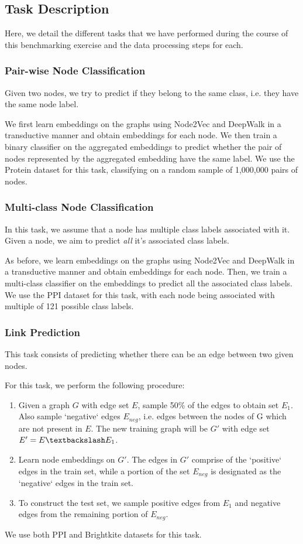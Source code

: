 \documentclass[sigconf]{acmart}
\begin{document}
\subsection{Task Description}
Here, we detail the different tasks that we have performed during the course of this benchmarking exercise and the data processing steps for each.

\subsubsection{Pair-wise Node Classification}
Given two nodes, we try to predict if they belong to the same class, i.e. they have the same node label. 

We first learn embeddings on the graphs using Node2Vec and DeepWalk in a transductive manner and obtain embeddings for each node. We then train a binary classifier on the aggregated embeddings to predict whether the pair of nodes represented by the aggregated embedding have the same label. We use the Protein dataset for this task, classifying on a random sample of 1,000,000 pairs of nodes. 

\subsubsection{Multi-class Node Classification}
In this task, we assume that a node has multiple class labels associated with it. Given a node, we aim to predict \textit{all} it's associated class labels.

As before, we learn embeddings on the graphs using Node2Vec and DeepWalk in a transductive manner and obtain embeddings for each node. Then, we train a multi-class classifier on the embeddings to predict all the associated class labels. We use the PPI dataset for this task, with each node being associated with multiple of 121 possible class labels.

\subsubsection{Link Prediction}
This task consists of predicting whether there can be an edge between two given nodes. 

For this task, we perform the following procedure:
\begin{enumerate}
    \item Given a graph $G$ with edge set $E$, sample 50\% of the edges to obtain set $E_1$. Also sample `negative` edges $E_{neg}$, i.e. edges between the nodes of G which are not present in $E$. The new training graph will be $G'$ with edge set $E'=E \textbackslash E_1$. 
    \item Learn node embeddings on $G'$. The edges in $G'$ comprise of the `positive` edges in the train set, while a portion of the set $E_{neg}$ is designated as the `negative` edges in the train set.
    \item To construct the test set, we sample positive edges from $E_1$ and negative edges from the remaining portion of $E_{neg}$.
\end{enumerate}
We use both PPI and Brightkite datasets for this task. 
\end{document}
